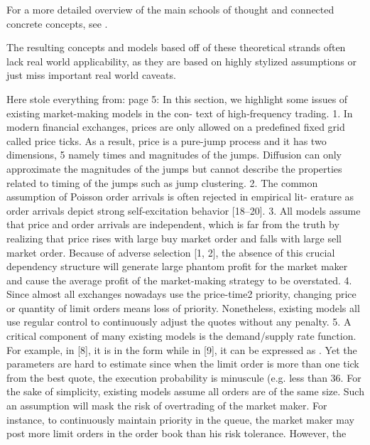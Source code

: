 \documentclass[12pt,a4paper]{cau_thesis}
\begin{document}
For a more detailed overview of the main schools of thought and
connected concrete concepts, see \cite{jain2024limitreview}.

The resulting concepts and models based off of these theoretical
strands often lack real world applicability, as they are based on
highly stylized assumptions or just miss important real world
caveats.

Here stole everything from: \cite{law2015pure} page 5: In this
section, we highlight some issues of existing market-making models in
the con- text of high-frequency trading. 1. In modern financial
exchanges, prices are only allowed on a predefined fixed grid called
price ticks. As a result, price is a pure-jump process and it has two
dimensions, 5 namely times and magnitudes of the jumps. Diffusion can
only approximate the magnitudes of the jumps but cannot describe the
properties related to timing of the jumps such as jump clustering. 2.
The common assumption of Poisson order arrivals is often rejected in
empirical lit- erature as order arrivals depict strong
self-excitation behavior [18–20]. 3. All models assume that price and
order arrivals are independent, which is far from the truth by
realizing that price rises with large buy market order and falls with
large sell market order. Because of adverse selection [1, 2], the
absence of this crucial dependency structure will generate large
phantom profit for the market maker and cause the average profit of
the market-making strategy to be overstated. 4. Since almost all
exchanges nowadays use the price-time2 priority, changing price or
quantity of limit orders means loss of priority. Nonetheless,
existing models all use regular control to continuously adjust the
quotes without any penalty. 5. A critical component of many existing
models is the demand/supply rate function. For example, in [8], it is
in the form while in [9], it can be expressed as . Yet the parameters
are hard to estimate since when the limit order is more than one tick
from the best quote, the execution probability is minuscule (e.g.
less than 36. For the sake of simplicity, existing models assume all
orders are of the same size. Such an assumption will mask the risk of
overtrading of the market maker. For instance, to continuously
maintain priority in the queue, the market maker may post more limit
orders in the order book than his risk tolerance. However, the
\end{document}
